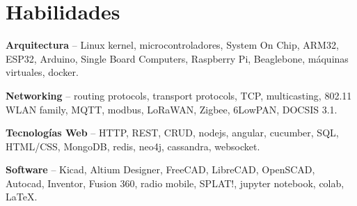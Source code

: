 \section{Habilidades}
\begin{small}
	\parbox[t][][t]{\linewidth}{
		\textbf{Arquitectura} -- {Linux kernel, 
		microcontroladores, System On Chip, 
		ARM32, ESP32, Arduino, Single Board Computers, Raspberry Pi, Beaglebone, 
		máquinas virtuales, docker.}
		\bigbreak
	}
	\parbox[t][][t]{\linewidth}{
		\textbf{Networking} -- {routing protocols, transport protocols, TCP,
		multicasting, 802.11 WLAN family, MQTT, modbus, LoRaWAN, Zigbee, 6LowPAN, DOCSIS 3.1.}
		\bigbreak
	}
	\parbox[t][][t]{\linewidth}{
		\textbf{Tecnologías Web} -- {HTTP, REST, CRUD, nodejs, angular, cucumber, 
		SQL, HTML/CSS, MongoDB, redis, neo4j, cassandra, websocket.}
		\bigbreak
	}
	\parbox[t][][t]{\linewidth}{
		\textbf{Software} -- {Kicad, Altium Designer, FreeCAD, 
		LibreCAD, OpenSCAD, Autocad, Inventor, Fusion 360, radio mobile, SPLAT!, jupyter notebook, colab,
		 \LaTeX.}
		\bigbreak
	}
\end{small}
